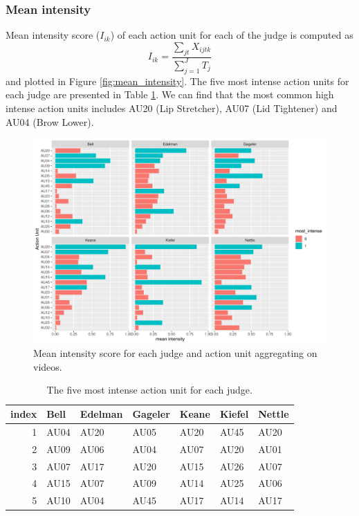 \documentclass{monashthesis}
\begin{document}
\hypertarget{mean-intensity}{%
\subsubsection{Mean intensity}\label{mean-intensity}}

Mean intensity score (\(I_{ik}\)) of each action unit for each of the judge is computed as \[I_{ik} = \frac{\sum_{jt}X_{ijtk}}{\sum_{j = 1}^JT_j}\] and plotted in Figure \ref{fig:mean_intensity}. The five most intense action units for each judge are presented in Table \ref{tab:most_intense}. We can find that the most common high intense action units includes AU20 (Lip Stretcher), AU07 (Lid Tightener) and AU04 (Brow Lower).

\begin{figure}

{\centering \includegraphics[width=1\linewidth]{figures/mean-intensity-1} 

}

\caption{Mean intensity score for each judge and action unit aggregating on videos.\label{fig:mean_intensity}}\label{fig:mean-intensity}
\end{figure}

\begin{table}[ht]
\begin{center}
\caption{\label{tab:most_intense}The five most intense action unit for each judge.}
\begin{tabular}{rllllll}
\toprule
index & Bell & Edelman & Gageler & Keane & Kiefel & Nettle \\
\midrule
1 & AU04 & AU20 & AU05 & AU20 & AU45 & AU20 \\
2 & AU09 & AU06 & AU04 & AU07 & AU20 & AU01 \\
3 & AU07 & AU17 & AU20 & AU15 & AU26 & AU07 \\
4 & AU15 & AU07 & AU09 & AU14 & AU25 & AU06 \\
5 & AU10 & AU04 & AU45 & AU17 & AU14 & AU17 \\
\bottomrule
\end{tabular}
\end{center}
\end{table}
\end{document}
